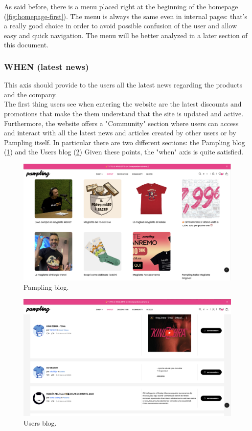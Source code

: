 As said before, there is a menu placed right at the beginning of the homepage (\cref{fig:homepage-first}).  
The menu is always the same even in internal pages: that's a really good choice in order to avoid possible confusion of the user and allow easy and quick navigation.
The menu will be better analyzed in a later section of this document.


\subsubsection{WHEN (latest news)} 
This axis should provide to the users all the latest news regarding the products and the company.\\

The first thing users see when entering the website are the latest discounts and promotions that make the them understand that the site is updated and active.
Furthermore, the website offers a "Community" section where users can access and interact with all the latest news and articles created by other users or by Pampling itself.
In particular there are two different sections: the Pampling blog (\cref{fig:blog-pampling}) and the Users blog (\cref{fig:blog-users})
Given these points, the "when" axis is quite satisfied.

\begin{figure}[h!]
	\centering
	\includegraphics[scale=0.225]{images/blog-pampling.png}
	\caption{Pampling blog.}
	\label{fig:blog-pampling}
\end{figure}

\begin{figure}[h!]
	\centering
	\includegraphics[scale=0.225]{images/blog-users.png}
	\caption{Users blog.}
	\label{fig:blog-users}
\end{figure}


